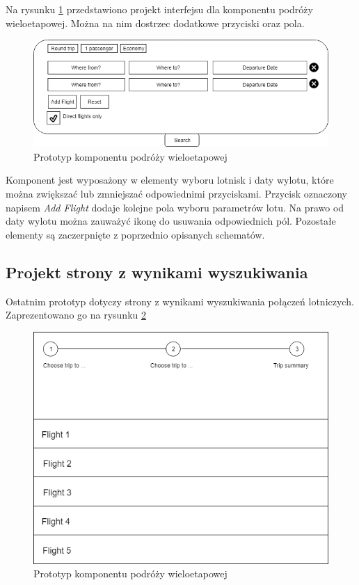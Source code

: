 \documentclass[12pt, twoside]{report}
\begin{document}
Na rysunku \ref{fig:multi_travel_interface} przedstawiono projekt interfejsu dla komponentu podróży wieloetapowej. Można na nim dostrzec dodatkowe przyciski oraz pola.
\begin{figure}[!ht]
\centering
\includegraphics[scale=0.60, keepaspectratio]{multi_travel_interface.PNG}
\caption{Prototyp komponentu podróży wieloetapowej}
\label{fig:multi_travel_interface}
\end{figure}
Komponent jest wyposażony w elementy wyboru lotnisk i daty wylotu, które można zwiększać lub zmniejszać odpowiednimi przyciskami. Przycisk oznaczony napisem \textit{Add Flight} dodaje kolejne pola wyboru parametrów lotu. Na prawo od daty wylotu można zauważyć ikonę do usuwania odpowiednich pól. Pozostałe elementy są zaczerpnięte z poprzednio opisanych schematów.
\subsection{Projekt strony z wynikami wyszukiwania}
Ostatnim prototyp dotyczy strony z wynikami wyszukiwania połączeń lotniczych. Zaprezentowano go na rysunku \ref{fig:result_interface}

\begin{figure}[!ht]
\centering
\includegraphics[scale=0.60, keepaspectratio]{result_interface.PNG}
\caption{Prototyp komponentu podróży wieloetapowej}
\label{fig:result_interface}
\end{figure}
\end{document}
